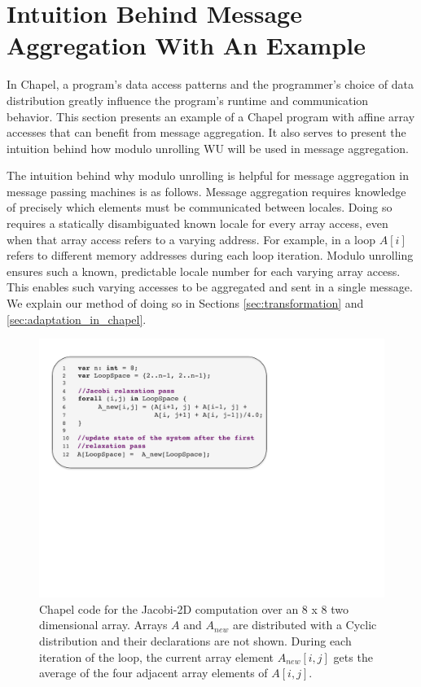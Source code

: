\section{Intuition Behind Message Aggregation With An Example}\label{sec:motivation_for_aggregation} 

In Chapel, a program's data access patterns and the programmer's choice of data distribution greatly influence the program's runtime and communication behavior. This section presents an example of a Chapel program with affine array accesses that can benefit from message aggregation. It also serves to present the intuition behind how modulo unrolling WU will be used in message aggregation. 

The intuition behind why modulo unrolling is helpful for message aggregation in message passing machines is as follows. Message aggregation requires knowledge of precisely which elements must be communicated between locales. Doing so requires a statically disambiguated known locale for every array access, even when that array access refers to a varying address. For example, in a loop $A[i]$ refers to different memory addresses during each loop iteration. Modulo unrolling ensures such a known, predictable locale number for each varying array access. This enables such varying accesses to be aggregated and sent in a single message. We explain our method of doing so in Sections \ref{sec:transformation} and \ref{sec:adaptation_in_chapel}.

\begin{figure}
\begin{center}
\includegraphics[width=\linewidth]{./Figures/jacobi}
\caption{Chapel code for the Jacobi-2D computation over an 8 x 8 two dimensional array. Arrays $A$ and $A_{new}$ are distributed with a Cyclic distribution and their declarations are not shown. During each iteration of the loop, the current array element $A_{new}[i, j]$ gets the average of the four adjacent array elements of $A[i, j]$.}
\label{jacobi_code}
\end{center}
\end{figure}

